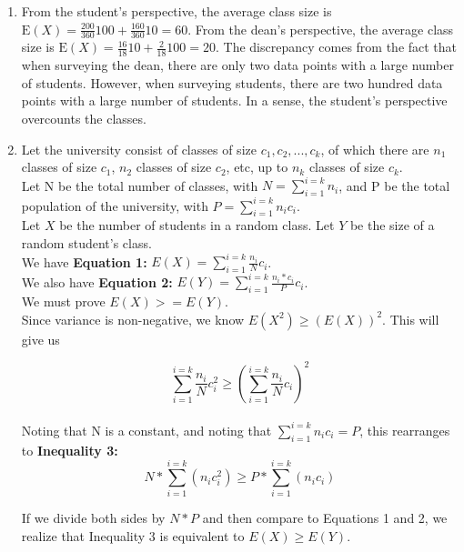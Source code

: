 \begin{enumerate}[label=(\alph*)]
\item From the student's perspective, the average class size is $\text{E}(X)
=
\frac{200}{360}100 + \frac{160}{360}10 = 60$. From the dean's perspective, the
average class size is $\text{E}(X) = \frac{16}{18}10 + \frac{2}{18}100 =
20$. The discrepancy comes from the fact that when surveying the dean, there are
only two data points with a large number of students. However, when surveying
students, there are two hundred data points with a large number of students.
In a sense, the student's perspective overcounts the classes.

\item Let the university consist of classes of size \(c_{1}, c_{2},...,c_{k}\), of which there are \(n_{1}\) classes of size \(c_{1}\), \(n_{2}\) classes of size \(c_{2}\), etc, up to \(n_{k}\) classes of size \(c_{k}\). \\

Let N be the total number of classes, with \(N = \sum\limits_{i=1}^{i=k}n_{i}\), and P be the total population of the university, with \(P = \sum\limits_{i=1}^{i=k}n_{i}c_{i}\).\\

Let \(X\) be the number of students in a random class. Let \(Y\) be the size of a random student's class.\\

We have \textbf{Equation 1: }\(E(X) = \sum\limits_{i=1}^{i=k}\frac{n_{i}}{N}c_{i}\).\\

We also have \textbf{Equation 2: }\(E(Y) = \sum\limits_{i=1}^{i=k}\frac{n_{i}*c_{i}}{P}c_{i}\). \\

We must prove \(E(X) >= E(Y)\).\\

Since variance is non-negative, we know \(E(X^{2}) \geq (E(X))^{2}\). This will give us

\[\sum\limits_{i=1}^{i=k}\frac{n_{i}}{N}c_{i}^{2} \geq (\sum\limits_{i=1}^{i=k}\frac{n_{i}}{N}c_{i})^2\]\\

Noting that N is a constant, and noting that \(\sum\limits_{i=1}^{i=k}n_{i}c_{i}=P\), this rearranges to \textbf{Inequality 3: }\[N*\sum\limits_{i=1}^{i=k}(n_{i}c_{i}^{2}) \geq P*\sum\limits_{i=1}^{i=k}(n_{i}c_{i})\]

If we divide both sides by \(N*P\) and then compare to Equations 1 and 2, we realize that Inequality 3 is equivalent to \(E(X) \geq E(Y)\). \\


\end{enumerate}
